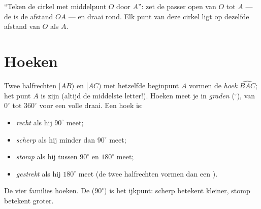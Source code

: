 \begin{example}\label{ex:g6:lines:circle}
``Teken de cirkel met middelpunt $O$ door $A$'': zet de passer open van $O$
tot $A$ --- de  is de afstand $OA$ --- en draai rond. Elk punt van deze
cirkel ligt op dezelfde afstand van $O$ als $A$.
\end{example}

\section{Hoeken}

\begin{definition}[Hoek]\label{def:g6:lines:angle}
Twee halfrechten $[AB)$ en $[AC)$ met hetzelfde beginpunt $A$ vormen de
\emph{hoek} $\widehat{BAC}$; het punt $A$ is zijn
\emph{} (altijd de middelste letter!). Hoeken meet je in
\emph{graden} ($^\circ$), van $0^\circ$ tot $360^\circ$ voor een volle
draai. Een hoek is:
\begin{itemize}
  \item \emph{recht} als hij $90^\circ$ meet;
  \item \emph{scherp} als hij minder dan $90^\circ$ meet;
  \item \emph{stomp} als hij tussen $90^\circ$ en $180^\circ$ meet;
  \item \emph{gestrekt} als hij $180^\circ$ meet (de twee halfrechten vormen
        dan een ).
\end{itemize}
\end{definition}

\begin{omfigure}

{\small De vier families hoeken. De  ($90^\circ$) is het ijkpunt:
scherp betekent kleiner, stomp betekent groter.}
\end{omfigure}

